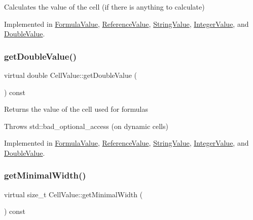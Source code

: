 Calculates the value of the cell (if there is anything to calculate) 

Implemented in \hyperlink{classFormulaValue_a8b8462588f3d533f6a5a39adee4f3eba}{Formula\+Value}, \hyperlink{classReferenceValue_a854b3c1368ad878010dd930307f9ccd2}{Reference\+Value}, \hyperlink{classStringValue_a36936ad0f3beac2f197192fba48d8580}{String\+Value}, \hyperlink{classIntegerValue_a00b35d20cf466e13c83feda8d782d0a4}{Integer\+Value}, and \hyperlink{classDoubleValue_a81b080a38fbc9de10db424f0eb381fd9}{Double\+Value}.

\mbox{\label{classCellValue_a3d2850b3a8473050fd46f486a29ed5bf}} 
\subsubsection{\texorpdfstring{get\+Double\+Value()}{getDoubleValue()}}
{\footnotesize\ttfamily virtual double Cell\+Value\+::get\+Double\+Value (\begin{DoxyParamCaption}{ }\end{DoxyParamCaption}) const\hspace{0.3cm}{\ttfamily [pure virtual]}}

Returns the value of the cell used for formulas

Throws std\+::bad\+\_\+optional\+\_\+access (on dynamic cells) 

Implemented in \hyperlink{classFormulaValue_a164f0c3e517db2fb4423e27e54ca4a60}{Formula\+Value}, \hyperlink{classReferenceValue_a1628a2c88bc97597b9f7e4f5b7a7a834}{Reference\+Value}, \hyperlink{classStringValue_a22bcc6ee544f8ad6e91ddb31a936bf66}{String\+Value}, \hyperlink{classIntegerValue_aafc02b663f92364a94ce69b796301730}{Integer\+Value}, and \hyperlink{classDoubleValue_ac598795c18713db7e49d07acd5859076}{Double\+Value}.

\mbox{\label{classCellValue_ad96473ba3dd88b83da96c03ae31a2ede}} 
\subsubsection{\texorpdfstring{get\+Minimal\+Width()}{getMinimalWidth()}}
{\footnotesize\ttfamily virtual size\+\_\+t Cell\+Value\+::get\+Minimal\+Width (\begin{DoxyParamCaption}{ }\end{DoxyParamCaption}) const\hspace{0.3cm}{\ttfamily [pure virtual]}}

